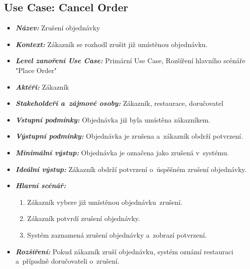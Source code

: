     \subsection{Use Case: Cancel Order}
	
	\begin{itemize}[itemsep=0pt]
        \item \textbf{\textit{Název:}} Zrušení objednávky
        \item \textbf{\textit{Kontext:}} Zákazník se rozhodl zrušit již umístěnou objednávku.
        \item \textbf{\textit{Level zanoření Use Case:}} Primární Use Case, Rozšíření hlavního scénáře "Place Order"
        \item \textbf{\textit{Aktéři:}} Zákazník
        \item \textbf{\textit{Stakeholdeři a~zájmové osoby:}} Zákazník, restaurace, doručovatel
        \item \textbf{\textit{Vstupní podmínky:}} Objednávka již byla umístěna zákazníkem.
        \item \textbf{\textit{Výstupní podmínky:}} Objednávka je zrušena a~zákazník obdrží potvrzení.
        \item \textbf{\textit{Minimální výstup:}} Objednávka je označena jako zrušená v~systému.
        \item \textbf{\textit{Ideální výstup:}} Zákazník obdrží potvrzení o~úspěšném zrušení objednávky.
        \item \textbf{\textit{Hlavní scénář:}}
			\begin{enumerate}[topsep=0pt]
            	\item Zákazník vybere již umístěnou objednávku~zrušení.
            	\item Zákazník potvrdí zrušení objednávky.
            	\item Systém zaznamená zrušení objednávky a~zobrazí potvrzení.
			\end{enumerate}
        \item \textbf{\textit{Rozšíření:}} Pokud zákazník zruší objednávku, systém oznámí restauraci a~případně doručovateli o~zrušení.
	\end{itemize}

